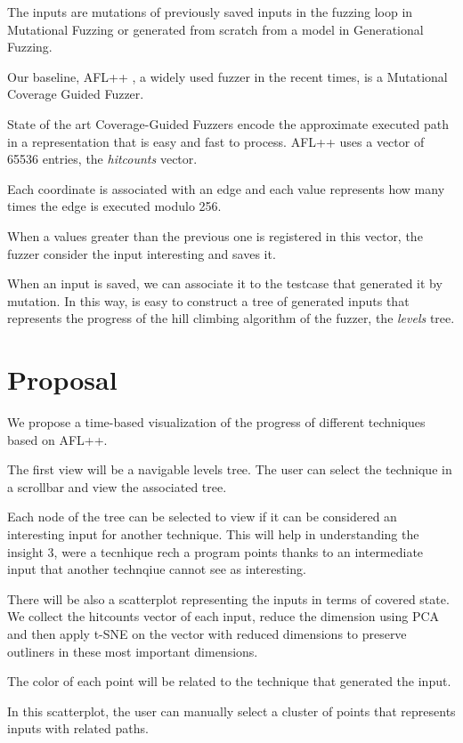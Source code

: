 \documentclass[conference,compsoc]{IEEEtran}
\begin{document}
The inputs are mutations of previously saved inputs in the fuzzing loop in Mutational Fuzzing or generated from scratch from a model in Generational Fuzzing.

Our baseline, {\sc AFL++} \cite{aflplusplus}, a widely used fuzzer in the recent times, is a Mutational Coverage Guided Fuzzer.

State of the art Coverage-Guided Fuzzers encode the approximate executed path in a representation that is easy and fast to process.
{\sc AFL++} uses a vector of 65536 entries, the {\it hitcounts} vector.

Each coordinate is associated with an edge and each value represents how many times the edge is executed modulo 256.

When a values greater than the previous one is registered in this vector, the fuzzer consider the input interesting and saves it.

When an input is saved, we can associate it to the testcase that generated it by mutation. In this way, is easy to construct a tree of generated inputs that represents the progress of the hill climbing algorithm of the fuzzer, the {\it levels} tree.

\section{Proposal}

We propose a time-based visualization of the progress of different techniques based on {\sc AFL++}.

The first view will be a navigable levels tree. The user can select the technique in a scrollbar and view the associated tree.

Each node of the tree can be selected to view if it can be considered an interesting input for another technique. This will help in understanding the insight 3, were a tecnhique rech a program points thanks to an intermediate input that another technqiue cannot see as interesting.

There will be also a scatterplot representing the inputs in terms of covered state.
We collect the hitcounts vector of each input, reduce the dimension using PCA and then apply t-SNE on the vector with reduced dimensions to preserve outliners in these most important dimensions.

The color of each point will be related to the technique that generated the input.

In this scatterplot, the user can manually select a cluster of points that represents inputs with related paths.
\end{document}
